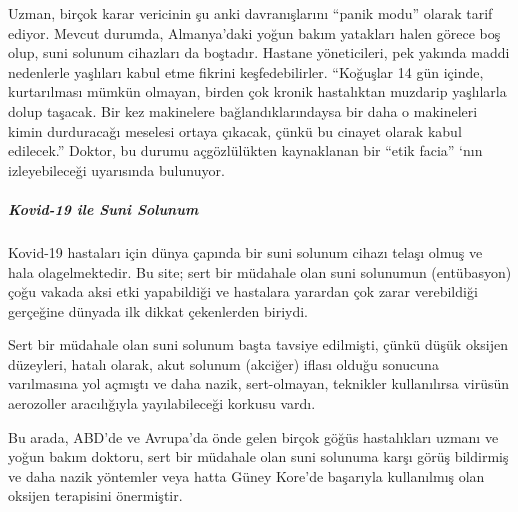 Uzman, birçok karar vericinin şu anki davranışlarını ``panik modu''
olarak tarif ediyor. Mevcut durumda, Almanya'daki yoğun bakım yatakları
halen görece boş olup, suni solunum cihazları da boştadır. Hastane
yöneticileri, pek yakında maddi nedenlerle yaşlıları kabul etme fikrini
keşfedebilirler. ``Koğuşlar 14 gün içinde, kurtarılması mümkün olmayan,
birden çok kronik hastalıktan muzdarip yaşlılarla dolup taşacak. Bir kez
makinelere bağlandıklarındaysa bir daha o makineleri kimin durduracağı
meselesi ortaya çıkacak, çünkü bu cinayet olarak kabul edilecek.''
Doktor, bu durumu açgözlülükten kaynaklanan bir ``etik facia'' `nın
izleyebileceği uyarısında bulunuyor.

\hypertarget{kovid-19-ile-suni-solunum-1}{%
\subparagraph{\texorpdfstring{\textbf{Kovid-19 ile Suni
Solunum}}{Kovid-19 ile Suni Solunum}}\label{kovid-19-ile-suni-solunum-1}}

Kovid-19 hastaları için dünya çapında bir suni solunum cihazı telaşı
olmuş ve hala olagelmektedir. Bu site; sert bir müdahale olan suni
solunumun (entübasyon) çoğu vakada aksi etki yapabildiği ve hastalara
yarardan çok zarar verebildiği gerçeğine dünyada ilk dikkat çekenlerden
biriydi.

Sert bir müdahale olan suni solunum başta tavsiye edilmişti, çünkü düşük
oksijen düzeyleri, hatalı olarak, akut solunum (akciğer) iflası olduğu
sonucuna varılmasına yol açmıştı ve daha nazik, sert-olmayan, teknikler
kullanılırsa virüsün aerozoller aracılığıyla yayılabileceği korkusu
vardı.

Bu arada, ABD'de ve Avrupa'da önde gelen birçok göğüs hastalıkları
uzmanı ve yoğun bakım doktoru, sert bir müdahale olan suni solunuma
karşı görüş bildirmiş ve daha nazik yöntemler veya hatta Güney Kore'de
başarıyla kullanılmış olan oksijen terapisini önermiştir.


